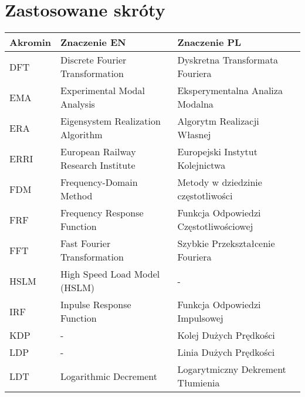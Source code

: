 \section*{Zastosowane skróty}
%
\makeatletter
\setlength{\@fptop}{0pt}
\makeatother


\begin{table}[H]
	\footnotesize
	\setlength\extrarowheight{5pt}
	\begin{tabular}{P{0.1\textwidth} P{0.4\textwidth} P{0.4\textwidth}}
		\toprule
		\textbf{Akromin} & \textbf{Znaczenie EN} & \textbf{Znaczenie PL} 					\\ \midrule
		DFT		& Discrete Fourier Transformation	& Dyskretna Transformata Fouriera \\ %
		EMA     & Experimental Modal Analysis         & Eksperymentalna Analiza Modalna         \\ %
		ERA		& Eigensystem Realization Algorithm & Algorytm Realizacji Własnej \\ %
		ERRI	& European Railway Research Institute & Europejski Instytut Kolejnictwa \\ %
		FDM		& Frequency-Domain Method & Metody w dziedzinie częstotliwości \\
		FRF		& Frequency Response Function	& Funkcja Odpowiedzi Częstotliwościowej \\ %
		FFT		& Fast Fourier Transformation	& Szybkie Przekształcenie Fouriera \\ %
		HSLM	& High Speed Load Model (HSLM) & - \\ %
		IRF		& Inpulse Response Function & Funkcja Odpowiedzi Impulsowej \\ %
		KDP		& -									&Kolej Dużych Prędkości 				\\  %
		LDP		& -									&Linia Dużych Prędkości 		\\ %
		LDT		& Logarithmic Decrement		& Logarytmiczny Dekrement Tłumienia \\ %

\end{tabular}
\end{table}
